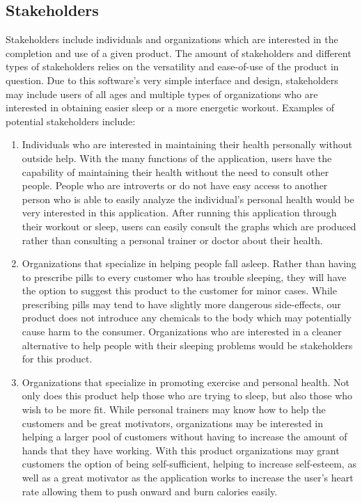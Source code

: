 \documentclass[letterpaper,english, 12pt]{scrreprt}
\begin{document}
\subsection{Stakeholders}
Stakeholders include individuals and organizations which are interested in the completion and use of a given product. The amount of stakeholders and different types of stakeholders relies on the versatility and ease-of-use of the product in question. Due to this software’s very simple interface and design, stakeholders may include users of all ages and multiple types of organizations who are interested in obtaining easier sleep or a more energetic workout. Examples of potential stakeholders include:
\begin{enumerate}
	\item Individuals who are interested in maintaining their health personally without outside help. With the many functions of the application, users have the capability of maintaining their health without the need to consult other people. People who are introverts or do not have easy access to another person who is able to easily analyze the individual’s personal health would be very interested in this application. After running this application through their workout or sleep, users can easily consult the graphs which are produced rather than consulting a personal trainer or doctor about their health.
	\item Organizations that specialize in helping people fall asleep. Rather than having to prescribe pills to every customer who has trouble sleeping, they will have the option to suggest this product to the customer for minor cases. While prescribing pills may tend to have slightly more dangerous side-effects, our product does not introduce any chemicals to the body which may potentially cause harm to the consumer. Organizations who are interested in a cleaner alternative to help people with their sleeping problems would be stakeholders for this product.
	\item Organizations that specialize in promoting exercise and personal health. Not only does this product help those who are trying to sleep, but also those who wish to be more fit. While personal trainers may know how to help the customers and be great motivators, organizations may be interested in helping a larger pool of customers without having to increase the amount of hands that they have working. With this product organizations may grant customers the option of being self-sufficient, helping to increase self-esteem, as well as a great motivator as the application works to increase the user’s heart rate allowing them to push onward and burn calories easily.

\end{enumerate}
\end{document}
